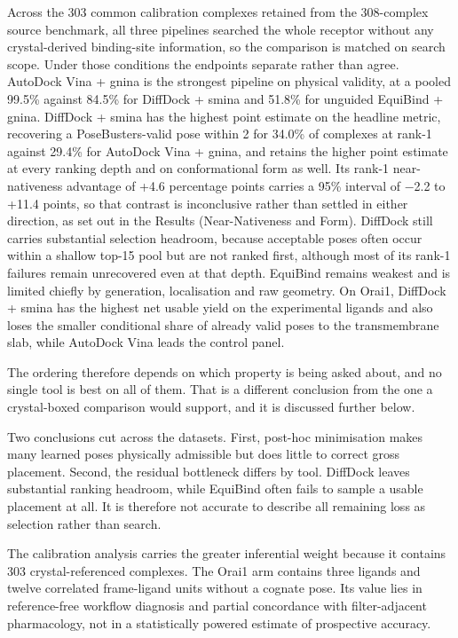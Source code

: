 Across the 303 common calibration complexes retained from the 308-complex source benchmark, all three pipelines searched the whole receptor without any crystal-derived binding-site information, so the comparison is matched on search scope. Under those conditions the endpoints separate rather than agree. AutoDock Vina + gnina is the strongest pipeline on physical validity, at a pooled 99.5\% against 84.5\% for DiffDock + smina and 51.8\% for unguided EquiBind + gnina. DiffDock + smina has the highest point estimate on the headline metric, recovering a PoseBusters-valid pose within 2\angstrom{} for 34.0\% of complexes at rank-1 against 29.4\% for AutoDock Vina + gnina, and retains the higher point estimate at every ranking depth and on conformational form as well. Its rank-1 near-nativeness advantage of +4.6 percentage points carries a 95\% interval of \ensuremath{-}2.2 to +11.4 points, so that contrast is inconclusive rather than settled in either direction, as set out in the Results (Near-Nativeness and Form). DiffDock still carries substantial selection headroom, because acceptable poses often occur within a shallow top-15 pool but are not ranked first, although most of its rank-1 failures remain unrecovered even at that depth. EquiBind remains weakest and is limited chiefly by generation, localisation and raw geometry. On Orai1, DiffDock + smina has the highest net usable yield on the experimental ligands and also loses the smaller conditional share of already valid poses to the transmembrane slab, while AutoDock Vina leads the control panel.

The ordering therefore depends on which property is being asked about, and no single tool is best on all of them. That is a different conclusion from the one a crystal-boxed comparison would support, and it is discussed further below.

Two conclusions cut across the datasets. First, post-hoc minimisation makes many learned poses physically admissible but does little to correct gross placement. Second, the residual bottleneck differs by tool. DiffDock leaves substantial ranking headroom, while EquiBind often fails to sample a usable placement at all. It is therefore not accurate to describe all remaining loss as selection rather than search.

The calibration analysis carries the greater inferential weight because it contains 303 crystal-referenced complexes. The Orai1 arm contains three ligands and twelve correlated frame-ligand units without a cognate pose. Its value lies in reference-free workflow diagnosis and partial concordance with filter-adjacent pharmacology, not in a statistically powered estimate of prospective accuracy.

